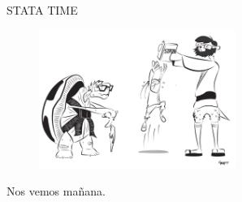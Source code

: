 \documentclass[10pt, aspectratio=169, compress]{beamer}
\begin{document}
\begin{frame}
	\begin{center}
	\LARGE STATA TIME
		\begin{figure}[H]
			\includegraphics[width=0.57\textwidth]{stata.pdf}
		\end{figure}
	\end{center}
\end{frame}
\begin{frame}
	Nos vemos mañana.
\end{frame}
\end{document}
